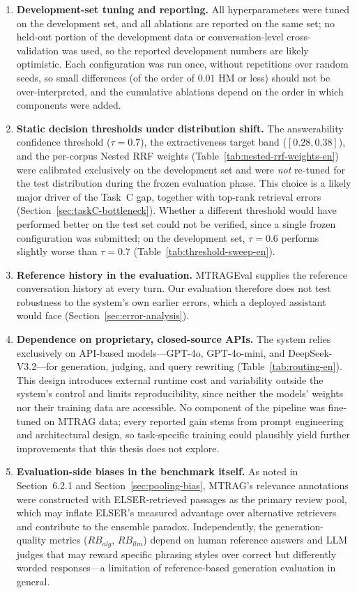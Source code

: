 \begin{enumerate}
    \item \textbf{Development-set tuning and reporting.} All hyperparameters were tuned on the development set, and all ablations are reported on the same set; no held-out portion of the development data or conversation-level cross-validation was used, so the reported development numbers are likely optimistic. Each configuration was run once, without repetitions over random seeds, so small differences (of the order of $0.01$ HM or less) should not be over-interpreted, and the cumulative ablations depend on the order in which components were added.
    \item \textbf{Static decision thresholds under distribution shift.} The answerability confidence threshold ($\tau{=}0.7$), the extractiveness target band ($[0.28, 0.38]$), and the per-corpus Nested RRF weights (Table~\ref{tab:nested-rrf-weights-en}) were calibrated exclusively on the development set and were \emph{not} re-tuned for the test distribution during the frozen evaluation phase. This choice is a likely major driver of the Task~C gap, together with top-rank retrieval errors (Section~\ref{sec:taskC-bottleneck}). Whether a different threshold would have performed better on the test set could not be verified, since a single frozen configuration was submitted; on the development set, $\tau{=}0.6$ performs slightly worse than $\tau{=}0.7$ (Table~\ref{tab:threshold-sweep-en}).
    \item \textbf{Reference history in the evaluation.} MTRAGEval supplies the reference conversation history at every turn. Our evaluation therefore does not test robustness to the system's own earlier errors, which a deployed assistant would face (Section~\ref{sec:error-analysis}).
    \item \textbf{Dependence on proprietary, closed-source APIs.} The system relies exclusively on API-based models---GPT-4o, GPT-4o-mini, and DeepSeek-V3.2---for generation, judging, and query rewriting (Table~\ref{tab:routing-en}). This design introduces external runtime cost and variability outside the system's control and limits reproducibility, since neither the models' weights nor their training data are accessible. No component of the pipeline was fine-tuned on MTRAG data; every reported gain stems from prompt engineering and architectural design, so task-specific training could plausibly yield further improvements that this thesis does not explore.
    \item \textbf{Evaluation-side biases in the benchmark itself.} As noted in Section~6.2.1 and Section~\ref{sec:pooling-bias}, MTRAG's relevance annotations were constructed with ELSER-retrieved passages as the primary review pool, which may inflate ELSER's measured advantage over alternative retrievers and contribute to the ensemble paradox. Independently, the generation-quality metrics ($RB_{alg}$, $RB_{llm}$) depend on human reference answers and LLM judges that may reward specific phrasing styles over correct but differently worded responses---a limitation of reference-based generation evaluation in general.

\end{enumerate}

